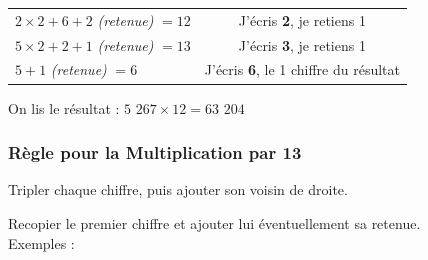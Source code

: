 \documentclass[a4paper]{article}
\begin{document}
\begin{small}
\begin{enumerate}
\begin{tabular}{l|c}
		$2 \times 2 + 6 + 2$ \textit{(retenue)} $= 12$ & J'écris \textbf{2}, je retiens 1
		
		
		\tabularnewline
		
		$5 \times 2 + 2 + 1$ \textit{(retenue)} $= 13$ & J'écris \textbf{3}, je retiens 1
		
		
		\tabularnewline
		
		$5 + 1$ \textit{(retenue)} $= 6$ & J'écris \textbf{6}, le 1\up{er} chiffre du résultat
		
	\end{tabular}
	
	On lis le résultat : {\boldmath $5$ $267 \times 12 = 63$ $204$}\\

\end{enumerate}
\end{small}


\vfill
{\noindent \dotfill}


\subsubsection*{Règle pour la Multiplication par 13}

Tripler chaque chiffre, puis ajouter son voisin de droite.

Recopier le premier chiffre et ajouter lui éventuellement sa retenue.\\

{ \parindent=0.5cm Exemples : }
\end{document}
